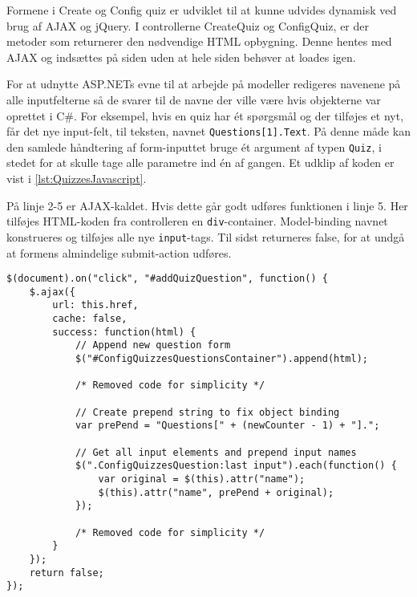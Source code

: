 Formene i Create og Config quiz er udviklet til at kunne udvides dynamisk ved brug af AJAX og jQuery. I controllerne CreateQuiz og ConfigQuiz, er der metoder som returnerer den nødvendige HTML opbygning. Denne hentes med AJAX og indsættes på siden uden at hele siden behøver at loades igen.

For at udnytte ASP.NETs evne til at arbejde på modeller redigeres navenene på alle inputfelterne så de svarer til de navne der ville være hvis objekterne var oprettet i C\#.
For eksempel, hvis en quiz har ét spørgsmål og der tilføjes et nyt, får det nye input-felt, til teksten, navnet \verb+Questions[1].Text+.
På denne måde kan den samlede håndtering af form-inputtet bruge ét argument af typen \verb+Quiz+, i stedet for at skulle tage alle parametre ind én af gangen. Et udklip af koden er vist i \lstlistingname \ref{lst:QuizzesJavascript}.

På linje 2-5 er AJAX-kaldet. Hvis dette går godt udføres funktionen i linje 5. Her tilføjes HTML-koden fra controlleren en \verb+div+-container. Model-binding navnet konstrueres og tilføjes alle nye \verb+input+-tags. Til sidst returneres false, for at undgå at formens almindelige submit-action udføres.

\begin{lstlisting}[caption=JavaScript udklip til AJAX og model-binding håndtering ved indsættelse af nye spørgsmål, label=lst:QuizzesJavascript]
$(document).on("click", "#addQuizQuestion", function() {
    $.ajax({
        url: this.href,
        cache: false,
        success: function(html) {
            // Append new question form
            $("#ConfigQuizzesQuestionsContainer").append(html);

            /* Removed code for simplicity */
			
            // Create prepend string to fix object binding
            var prePend = "Questions[" + (newCounter - 1) + "].";

            // Get all input elements and prepend input names
            $(".ConfigQuizzesQuestion:last input").each(function() {
                var original = $(this).attr("name");
                $(this).attr("name", prePend + original);
            });
            
            /* Removed code for simplicity */
        }
    });
    return false;
});
\end{lstlisting}